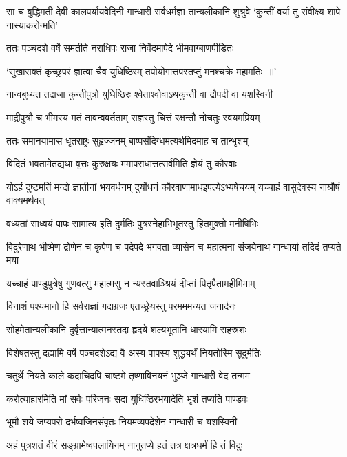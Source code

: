 \threelineshloka
{सा च बुद्धिमती देवी कालपर्यायवेदिनी}
{गान्धारी सर्वधर्मज्ञा तान्यलीकानि शुश्रुवे}
{`कुन्तीं वर्या तु संवीक्ष्य शापे नास्याकरोन्मति'}


\twolineshloka
{ततः पञ्चदशे वर्षे समतीते नराधिपः}
{राजा निर्वेदमापेदे भीमवाग्बाणपीडितः}


\twolineshloka
{`सुखासक्तं कृच्छ्रपरं ज्ञात्वा चैव युधिष्ठिरम्}
{तपोयोगात्तपस्तप्तुं मनश्चक्रे महामतिः ॥'}


\twolineshloka
{नान्वबुध्यत तद्राजा कुन्तीपुत्रो युधिष्ठिरः}
{श्वेताश्वोवाऽथकुन्ती वा द्रौपदी वा यशस्विनी}


\twolineshloka
{माद्रीपुत्रौ च भीमस्य मतं तावन्ववर्तताम्}
{राज्ञस्तु चित्तं रक्षन्तौ नोचतुः स्वयमप्रियम्}


\twolineshloka
{ततः समानयामास धृतराष्ट्रः सुहृज्जनम्}
{बाष्पसंदिग्धमत्यर्थमिदमाह च तान्भृशम्}


\twolineshloka
{विदितं भवतामेतद्यथा वृत्तः कुरुक्षयः}
{ममापराधात्तत्सर्वमिति ज्ञेयं तु कौरवाः}


\threelineshloka
{योऽहं दुष्टमतिं मन्दो ज्ञातीनां भयवर्धनम्}
{दुर्योधनं कौरवाणामाधइपत्येऽभ्यषेचयम्}
{यच्चाहं वासुदेवस्य नाश्रौषं वाक्यमर्थवत्}


\twolineshloka
{वध्यतां साध्वयं पापः सामात्य इति दुर्मतिः}
{पुत्रस्नेहाभिभूतस्तु हितमुक्तो मनीषिभिः}


\threelineshloka
{विदुरेणाथ भीष्मेण द्रोणेन च कृपेण च}
{पदेपदे भगवता व्यासेन च महात्मना}
{संजयेनाथ गान्धार्या तदिदं तप्यते मया}


\twolineshloka
{यच्चाहं पाण्डुपुत्रेषु गुणवत्सु महात्मसु}
{न न्यस्तवाञ्श्रियं दीप्तां पितृपैतामहीमिमाम्}


\twolineshloka
{विनाशं पश्यमानो हि सर्वराज्ञां गदाग्रजः}
{एतच्छ्रेयस्तु परमममन्यत जनार्दनः}


\twolineshloka
{सोहमेतान्यलीकानि दुर्वृत्तान्यात्मनस्तदा}
{हृदये शल्यभूतानि धारयामि सहस्रशः}


\twolineshloka
{विशेषतस्तु दह्यामि वर्षे पञ्चदशेऽद्य वै}
{अस्य पापस्य शुद्ध्यर्थं नियतोस्मि सुदुर्मतिः}


\twolineshloka
{चतुर्थे नियते काले कदाचिदपि चाष्टमे}
{तृष्णाविनयनं भुञ्जे गान्धारी वेद तन्मम}


\twolineshloka
{करोत्याहारमिति मां सर्वः परिजनः सदा}
{युधिष्ठिरभयादेति भृशं तप्यति पाण्डवः}


\twolineshloka
{भूमौ शये जप्यपरो दर्भष्वजिनसंवृतः}
{नियमव्यपदेशेन गान्धारी च यशस्विनी}


\twolineshloka
{अहं पुत्रशतं वीरं सङ्ग्रामेष्वपलायिनम्}
{नानुतप्ये हतं तत्र क्षत्रधर्मं हि तं विदुः}


